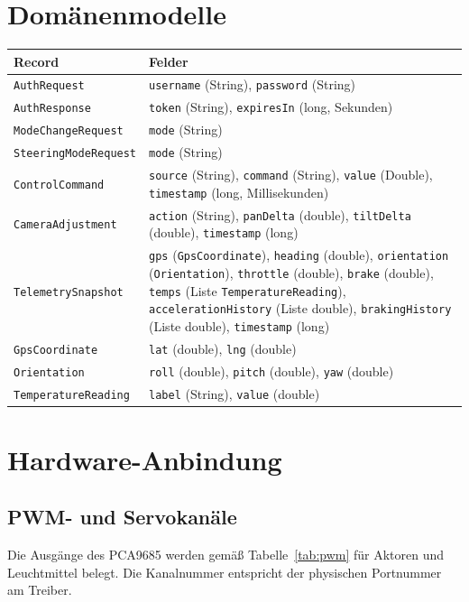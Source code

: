 \documentclass[a4paper,11pt]{article}
\begin{document}
\section{Domänenmodelle}
\begin{longtable}{p{4cm}p{9cm}}
\textbf{Record} & \textbf{Felder}\\\hline
\texttt{AuthRequest} & \texttt{username} (String), \texttt{password} (String)\\
\texttt{AuthResponse} & \texttt{token} (String), \texttt{expiresIn} (long, Sekunden)\\
\texttt{ModeChangeRequest} & \texttt{mode} (String)\\
\texttt{SteeringModeRequest} & \texttt{mode} (String)\\
\texttt{ControlCommand} & \texttt{source} (String), \texttt{command} (String), \texttt{value} (Double), \texttt{timestamp} (long, Millisekunden)\\
\texttt{CameraAdjustment} & \texttt{action} (String), \texttt{panDelta} (double), \texttt{tiltDelta} (double), \texttt{timestamp} (long)\\
\texttt{TelemetrySnapshot} & \texttt{gps} (\texttt{GpsCoordinate}), \texttt{heading} (double), \texttt{orientation} (\texttt{Orientation}), \texttt{throttle} (double), \texttt{brake} (double), \texttt{temps} (Liste \texttt{TemperatureReading}), \texttt{accelerationHistory} (Liste double), \texttt{brakingHistory} (Liste double), \texttt{timestamp} (long)\\
\texttt{GpsCoordinate} & \texttt{lat} (double), \texttt{lng} (double)\\
\texttt{Orientation} & \texttt{roll} (double), \texttt{pitch} (double), \texttt{yaw} (double)\\
\texttt{TemperatureReading} & \texttt{label} (String), \texttt{value} (double)\\
\end{longtable}

\section{Hardware-Anbindung}
\subsection{PWM- und Servokanäle}
Die Ausgänge des PCA9685 werden gemäß Tabelle~\ref{tab:pwm} für Aktoren und Leuchtmittel
belegt. Die Kanalnummer entspricht der physischen Portnummer am Treiber.
\end{document}
